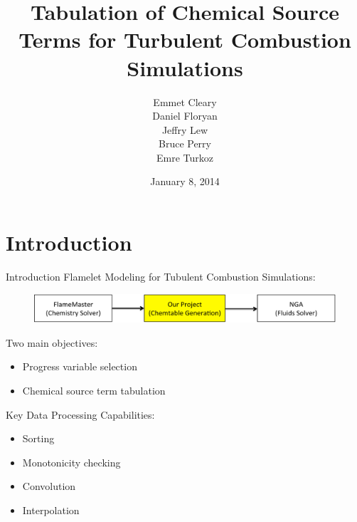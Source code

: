 \documentclass{beamer}
\title[APC 524 Design Review]{Tabulation of Chemical Source Terms for Turbulent Combustion Simulations}
\author{Emmet Cleary \\
Daniel Floryan \\
Jeffry Lew \\
Bruce Perry \\
Emre Turkoz}
\date{January 8, 2014}
\begin{document}
\begin{frame}
  \titlepage
\end{frame}


\section{Introduction}
\begin{frame}{Introduction}
Flamelet Modeling for Tubulent Combustion Simulations:
\begin{figure}
\includegraphics[width=\textwidth]{scope.pdf}
\end{figure}
Two main objectives:
\begin{itemize}
\item Progress variable selection
\item Chemical source term tabulation
\end{itemize}
\vspace{6pt}
Key Data Processing Capabilities:
\begin{itemize}
\item Sorting
\item Monotonicity checking
\item Convolution
\item Interpolation
\end{itemize}
\vspace{12pt}
\end{frame}
\end{document}
